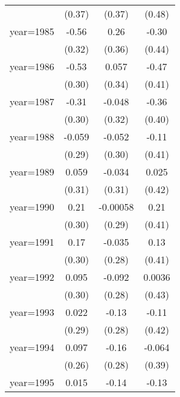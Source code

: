\begin{table}[htbp]
\begin{tabular}{l*{3}{c}}
                &   (0.37)         &   (0.37)         &   (0.48)         \\
\addlinespace
year=1985       &    -0.56         &     0.26         &    -0.30         \\
                &   (0.32)         &   (0.36)         &   (0.44)         \\
\addlinespace
year=1986       &    -0.53         &    0.057         &    -0.47         \\
                &   (0.30)         &   (0.34)         &   (0.41)         \\
\addlinespace
year=1987       &    -0.31         &   -0.048         &    -0.36         \\
                &   (0.30)         &   (0.32)         &   (0.40)         \\
\addlinespace
year=1988       &   -0.059         &   -0.052         &    -0.11         \\
                &   (0.29)         &   (0.30)         &   (0.41)         \\
\addlinespace
year=1989       &    0.059         &   -0.034         &    0.025         \\
                &   (0.31)         &   (0.31)         &   (0.42)         \\
\addlinespace
year=1990       &     0.21         & -0.00058         &     0.21         \\
                &   (0.30)         &   (0.29)         &   (0.41)         \\
\addlinespace
year=1991       &     0.17         &   -0.035         &     0.13         \\
                &   (0.30)         &   (0.28)         &   (0.41)         \\
\addlinespace
year=1992       &    0.095         &   -0.092         &   0.0036         \\
                &   (0.30)         &   (0.28)         &   (0.43)         \\
\addlinespace
year=1993       &    0.022         &    -0.13         &    -0.11         \\
                &   (0.29)         &   (0.28)         &   (0.42)         \\
\addlinespace
year=1994       &    0.097         &    -0.16         &   -0.064         \\
                &   (0.26)         &   (0.28)         &   (0.39)         \\
\addlinespace
year=1995       &    0.015         &    -0.14         &    -0.13         \\

\end{tabular}
\end{table}
